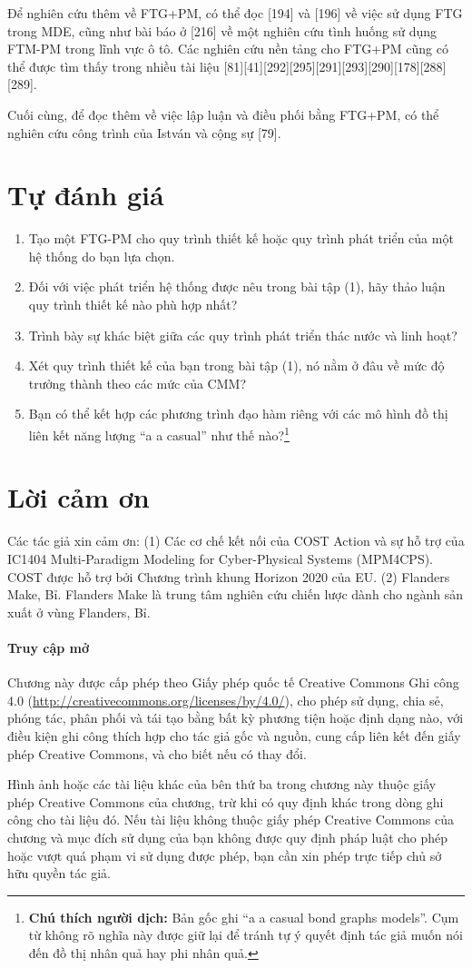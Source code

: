 Để nghiên cứu thêm về FTG+PM, có thể đọc [194] và [196] về việc sử dụng FTG trong MDE, cũng như bài báo ở [216] về một nghiên cứu tình huống sử dụng FTM-PM trong lĩnh vực ô tô. Các nghiên cứu nền tảng cho FTG+PM cũng có thể được tìm thấy trong nhiều tài liệu [81][41][292][295][291][293][290][178][288][289].

Cuối cùng, để đọc thêm về việc lập luận và điều phối bằng FTG+PM, có thể nghiên cứu công trình của István và cộng sự [79].

\section{Tự đánh giá}
\begin{enumerate}
\item Tạo một FTG-PM cho quy trình thiết kế hoặc quy trình phát triển của một hệ thống do bạn lựa chọn.
\item Đối với việc phát triển hệ thống được nêu trong bài tập (1), hãy thảo luận quy trình thiết kế nào phù hợp nhất?
\item Trình bày sự khác biệt giữa các quy trình phát triển thác nước và linh hoạt?
\item Xét quy trình thiết kế của bạn trong bài tập (1), nó nằm ở đâu về mức độ trưởng thành theo các mức của CMM?
\item Bạn có thể kết hợp các phương trình đạo hàm riêng với các mô hình đồ thị liên kết năng lượng ``a a casual'' như thế nào?\footnote{\textbf{Chú thích người dịch:} Bản gốc ghi ``a a casual bond graphs models''. Cụm từ không rõ nghĩa này được giữ lại để tránh tự ý quyết định tác giả muốn nói đến đồ thị nhân quả hay phi nhân quả.}
\end{enumerate}

\section*{Lời cảm ơn}
Các tác giả xin cảm ơn: (1) Các cơ chế kết nối của COST Action và sự hỗ trợ của IC1404 Multi-Paradigm Modeling for Cyber-Physical Systems (MPM4CPS). COST được hỗ trợ bởi Chương trình khung Horizon 2020 của EU. (2) Flanders Make, Bỉ. Flanders Make là trung tâm nghiên cứu chiến lược dành cho ngành sản xuất ở vùng Flanders, Bỉ.

\paragraph{Truy cập mở}
Chương này được cấp phép theo Giấy phép quốc tế Creative Commons Ghi công 4.0 (\url{http://creativecommons.org/licenses/by/4.0/}), cho phép sử dụng, chia sẻ, phóng tác, phân phối và tái tạo bằng bất kỳ phương tiện hoặc định dạng nào, với điều kiện ghi công thích hợp cho tác giả gốc và nguồn, cung cấp liên kết đến giấy phép Creative Commons, và cho biết nếu có thay đổi.

Hình ảnh hoặc các tài liệu khác của bên thứ ba trong chương này thuộc giấy phép Creative Commons của chương, trừ khi có quy định khác trong dòng ghi công cho tài liệu đó. Nếu tài liệu không thuộc giấy phép Creative Commons của chương và mục đích sử dụng của bạn không được quy định pháp luật cho phép hoặc vượt quá phạm vi sử dụng được phép, bạn cần xin phép trực tiếp chủ sở hữu quyền tác giả.
